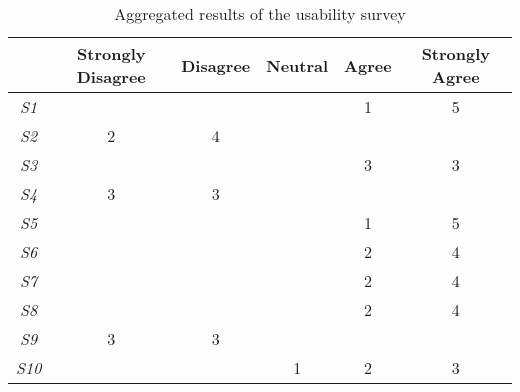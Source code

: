 \documentclass[../../UsabilityReport.tex]{subfiles}
\begin{document}
	\begin{table}[htb]
		\centering
		\caption{Aggregated results of the usability survey}
		\begin{tabular}{|c|c|c|c|c|c|}
			\hline
			& \multicolumn{1}{|p{14mm}|}{Strongly Disagree} & \multicolumn{1}{|p{14mm}|}{Disagree} & \multicolumn{1}{|p{14mm}|}{Neutral} & \multicolumn{1}{|p{14mm}|}{Agree} & \multicolumn{1}{|p{14mm}|}{Strongly Agree} \\ \hline
			\textit{S1}  & & & & \multicolumn{1}{c|}{1} & \multicolumn{1}{c|}{5} \\ \hline
			\textit{S2}  & \multicolumn{1}{c|}{2} & \multicolumn{1}{c|}{4} & & & \\ \hline
			\textit{S3}  & & & & \multicolumn{1}{c|}{3} & \multicolumn{1}{c|}{3} \\ \hline
			\textit{S4}  & \multicolumn{1}{c|}{3} & \multicolumn{1}{c|}{3} & & & \\ \hline
			\textit{S5}  & & & & \multicolumn{1}{c|}{1} & \multicolumn{1}{c|}{5} \\ \hline
			\textit{S6}  & & & & \multicolumn{1}{c|}{2} & \multicolumn{1}{c|}{4} \\ \hline
			\textit{S7}  & & & & \multicolumn{1}{c|}{2} & \multicolumn{1}{c|}{4} \\ \hline
			\textit{S8}  & & & & \multicolumn{1}{c|}{2} & \multicolumn{1}{c|}{4} \\ \hline
			\textit{S9}  & \multicolumn{1}{c|}{3} & \multicolumn{1}{c|}{3} & & & \\ \hline
			\textit{S10} & & & \multicolumn{1}{c|}{1} & \multicolumn{1}{c|}{2} & \multicolumn{1}{c|}{3} \\ \hline
		\end{tabular}
	\end{table}
\end{document}
